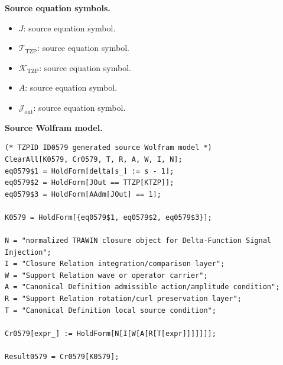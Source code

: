 \begin{minipage}[t]{0.49\linewidth}
\begingroup
\small
\raggedright
\textbf{Source equation symbols.}\par
\begin{itemize}[leftmargin=1.35em,itemsep=1pt,topsep=1pt,parsep=0pt]
    \item $J$: source equation symbol.
    \item $\mathcal{T}_{\mathrm{TZP}}$: source equation symbol.
    \item $\mathcal{K}_{\mathrm{TZP}}$: source equation symbol.
    \item $A$: source equation symbol.
    \item $\mathcal{J}_{\mathrm{out}}$: source equation symbol.
\end{itemize}
\endgroup
\end{minipage}\hfill
\begin{minipage}[t]{0.47\linewidth}
\begingroup
\scriptsize
\raggedright
\textbf{Source Wolfram model.}\par
\begin{Verbatim}[fontsize=\tiny,breaklines=true,breakanywhere=true]
(* TZPID ID0579 generated source Wolfram model *)
ClearAll[K0579, Cr0579, T, R, A, W, I, N];
eq0579$1 = HoldForm[delta[s_] := s - 1];
eq0579$2 = HoldForm[JOut == TTZP[KTZP]];
eq0579$3 = HoldForm[AAdm[JOut] == 1];

K0579 = HoldForm[{eq0579$1, eq0579$2, eq0579$3}];

N = "normalized TRAWIN closure object for Delta-Function Signal Injection";
I = "Closure Relation integration/comparison layer";
W = "Support Relation wave or operator carrier";
A = "Canonical Definition admissible action/amplitude condition";
R = "Support Relation rotation/curl preservation layer";
T = "Canonical Definition local source condition";

Cr0579[expr_] := HoldForm[N[I[W[A[R[T[expr]]]]]]];

Result0579 = Cr0579[K0579];
\end{Verbatim}
\endgroup
\end{minipage}

